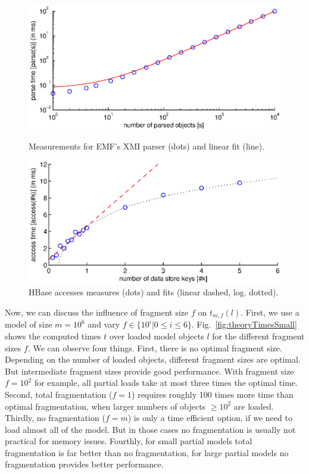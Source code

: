 \begin{figure}[ht]
\begin{minipage}[b]{0.48\linewidth}
\centering
\includegraphics[width=\linewidth]{figures/emfParsePerf}
\caption{Measurements for EMF's XMI parser (dots) and linear fit (line).}
\label{fig:emfParsePerf}
\end{minipage}
\hspace{0.02\linewidth}
\begin{minipage}[b]{0.48\linewidth}
\centering
\includegraphics[width=\linewidth]{figures/hbaseAccessPerf}
\caption{HBase accesses measures (dots) and fits (linear dashed, log. dotted).}
\label{fig:hbaseAccessPerf}
\end{minipage}
\end{figure}

 
Now, we can discuss the influence of fragment size $f$ on $t_{m,f}(l)$. First, we use a model of size $m=10^6$ and vary $f\in\{10^i|0\le i \le 6\}$. Fig.~\ref{fig:theoryTimesSmall} shows the computed times $t$ over loaded model objects $l$ for the different fragment sizes $f$. We can observe four things. First, there is no optimal fragment size. Depending on the number of loaded objects, different fragment sizes are optimal. But intermediate fragment sizes provide good performance. With fragment size $f=10^2$ for example, all partial loads take at most three times the optimal time. Second, total fragmentation ($f=1$) requires roughly 100 times more time than optimal fragmentation, when larger numbers of objects $\ge 10^2$ are loaded. Thirdly, no fragmentation ($f=m$) is only a time efficient option, if we need to load almost all of the model. But in those cases no fragmentation is usually not practical for memory issues. Fourthly, for small partial models total fragmentation is far better than no fragmentation, for large partial models no fragmentation provides better performance.

